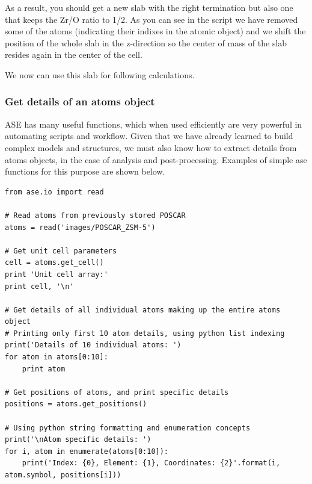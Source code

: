 \documentclass[11pt]{article}
\begin{document}
As a result, you should get a new slab with the right termination but also one that keeps the Zr/O ratio to 1/2. As you can see in the script we have removed some of the atoms (indicating their indixes in the atomic object) and we shift the position of the whole slab in the z-direction so the center of mass of the slab resides again in the center of the cell.

We now can use this slab for following calculations.  

\subsubsection{Get details of an atoms object}
\label{sec-5-0-6}
ASE has many useful functions, which when used efficiently are very powerful in automating scripts and workflow. Given that we have already learned to build complex models and structures, we must also know how to extract details from atoms objects, in the case of analysis and post-processing. Examples of simple ase functions for this purpose are shown below.
\begin{verbatim}
from ase.io import read

# Read atoms from previously stored POSCAR
atoms = read('images/POSCAR_ZSM-5')

# Get unit cell parameters
cell = atoms.get_cell()
print 'Unit cell array:' 
print cell, '\n'

# Get details of all individual atoms making up the entire atoms object
# Printing only first 10 atom details, using python list indexing
print('Details of 10 individual atoms: ')
for atom in atoms[0:10]:
    print atom

# Get positions of atoms, and print specific details
positions = atoms.get_positions()

# Using python string formatting and enumeration concepts
print('\nAtom specific details: ')
for i, atom in enumerate(atoms[0:10]):
    print('Index: {0}, Element: {1}, Coordinates: {2}'.format(i, atom.symbol, positions[i]))
\end{verbatim}
\end{document}
